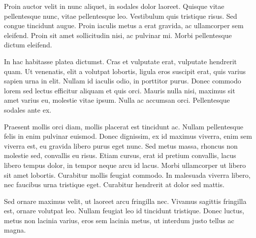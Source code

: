 Proin auctor velit in nunc aliquet, in sodales dolor laoreet. Quisque vitae pellentesque nunc, vitae pellentesque leo. Vestibulum quis tristique risus. Sed congue tincidunt augue. Proin iaculis metus a erat gravida, ac ullamcorper sem eleifend. Proin sit amet sollicitudin nisi, ac pulvinar mi. Morbi pellentesque dictum eleifend.

In hac habitasse platea dictumst. Cras et vulputate erat, vulputate hendrerit quam. Ut venenatis, elit a volutpat lobortis, ligula eros suscipit erat, quis varius sapien urna in elit. Nullam id iaculis odio, in porttitor purus. Donec commodo lorem sed lectus efficitur aliquam et quis orci. Mauris nulla nisi, maximus sit amet varius eu, molestie vitae ipsum. Nulla ac accumsan orci. Pellentesque sodales ante ex.

Praesent mollis orci diam, mollis placerat est tincidunt ac. Nullam pellentesque felis in enim pulvinar euismod. Donec dignissim, ex id maximus viverra, enim sem viverra est, eu gravida libero purus eget nunc. Sed metus massa, rhoncus non molestie sed, convallis eu risus. Etiam cursus, erat id pretium convallis, lacus libero tempus dolor, in tempor neque arcu id lacus. Morbi ullamcorper ut libero sit amet lobortis. Curabitur mollis \cite{ref4} feugiat commodo. In malesuada viverra libero, nec faucibus urna tristique eget. Curabitur hendrerit at dolor sed mattis.

Sed ornare maximus velit, ut laoreet arcu fringilla nec. Vivamus sagittis fringilla est, ornare volutpat leo. Nullam feugiat leo id tincidunt tristique. Donec luctus, metus non lacinia varius, eros sem lacinia metus, ut interdum justo tellus ac magna.